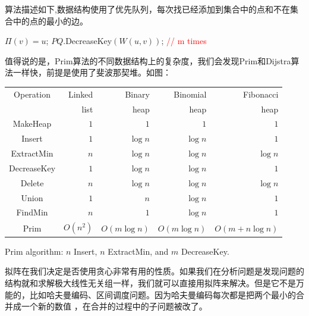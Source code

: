 算法描述如下,数据结构使用了优先队列，每次找已经添加到集合中的点和不在集合中的点的最小的边。\\
\begin{algorithmic}[1]
\ENDFOR
{}
\STATE $\Pi( v ) = u $; 
\STATE $PQ.${\sc DecreaseKey}$(  W(u, v) )$; \textcolor{red}{// m times}
\ENDIF
\ENDFOR
\ENDWHILE
\end{algorithmic}
值得说的是，Prim算法的不同数据结构上的复杂度，我们会发现Prim和Dijstra算法一样快，前提是使用了斐波那契堆。如图：
  \begin{table}[!htbp]
  \begin{tabular}{crrrr}
  \hline  \hline
  Operation & Linked  & Binary  & Binomial  & Fibonacci  \\
            &  list &  heap &  heap & heap \\
  \hline
  {\sc MakeHeap} & $ 1 $ &  $1$  & $ 1 $ & $1$  \\ 
  {\sc Insert} & $ 1 $ &  $\log n$  & $ \log n $ & $1$  \\ 
   {\sc ExtractMin} & $ n $ &  $\log n$  & $ \log n  $ & $ \log n $  \\ 
  {\sc DecreaseKey} & $ 1 $ &  $\log n$  & $ \log n $ & $1$  \\ 
  {\sc Delete} & $ n $ &  $\log n$  & $ \log n $ & $\log n$  \\ 
  {\sc Union} & $ 1 $ &  $ n $  & $ \log n $ & $1$  \\ 
   {\sc FindMin} & $ n $ &  $1$  & $ \log n $ & $1$  \\ 
  \hline 
  {\sc Prim} & $ O(n^2) $ &  $ O(m \log n) $  & $ O( m \log n ) $ & $ O( m + n \log n) $  \\ 
  \hline \hline 
  \end{tabular} 
  \end{table}
{\sc Prim} algorithm: $n$ {\sc Insert}, $n$ {\sc ExtractMin}, and $m$ {\sc DecreaseKey}. 

拟阵在我们决定是否使用贪心非常有用的性质。如果我们在分析问题是发现问题的结构就和求解极大线性无关组一样，我们就可以直接用拟阵来解决。但是它不是万能的，比如哈夫曼编码、区间调度问题。因为哈夫曼编码每次都是把两个最小的合并成一个新的数值
，在合并的过程中的子问题被改了。


